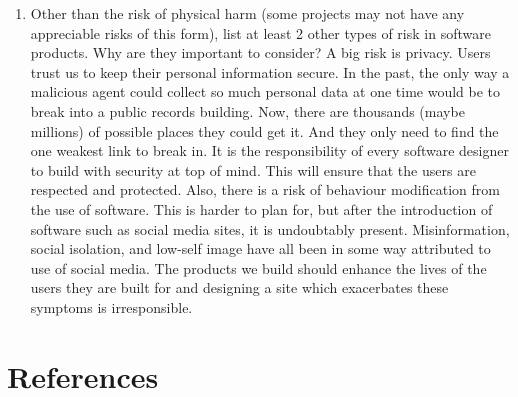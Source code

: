 \documentclass{article}
\begin{document}
\begin{enumerate}
    \item Other than the risk of physical harm (some projects may not have any
    appreciable risks of this form), list at least 2 other types of risk in
    software products. Why are they important to consider?
    A big risk is privacy. Users trust us to keep their personal information secure. In the past, the only way a malicious agent could collect so much personal data at one time 
    would be to break into a public records building. Now, there are thousands (maybe millions) of possible places they could get it. And they only need to find the one weakest link to break in. 
    It is the responsibility of every software designer to build with security at top of mind. This will ensure that the users are respected and protected.
    Also, there is a risk of behaviour modification from the use of software. This is harder to plan for, but after the introduction of software such as social media sites, it is undoubtably present.
    Misinformation, social isolation, and low-self image have all been in some way attributed to use of social media. The products we build should enhance the lives of the users they are built for
    and designing a site which exacerbates these symptoms is irresponsible.

\end{enumerate}
\newpage
\section{References}
\sloppy
\end{document}
